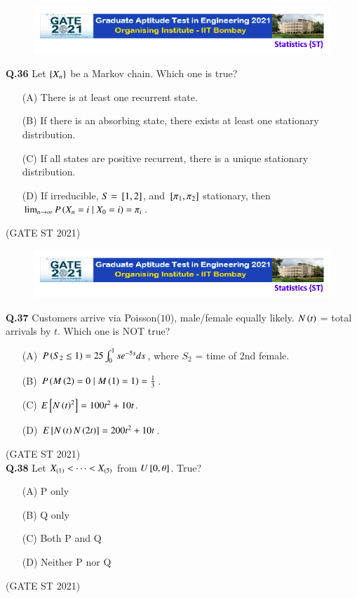 \documentclass[journal,12pt,onecolumn]{IEEEtran}
\theoremstyle{remark}
\begin{document}
\begin{figure}
 \centering
    \includegraphics[width=1\linewidth]{figs/0.png} 
\end{figure}
\textbf{Q.36}
Let $\left\{X_n\right\}$ be a Markov chain. Which one is true?
\begin{enumerate}
\item[(A)] There is at least one recurrent state.
\item[(B)] If there is an absorbing state, there exists at least one stationary distribution.
\item[(C)] If all states are positive recurrent, there is a unique stationary distribution.
\item[(D)] If irreducible, $S = {}\left[1,2\right]$, and ${}\left[\pi_1,\pi_2\right]$ stationary, then $\lim_{n\to\infty} P\left(X_n=i \mid X_0=i\right) = \pi_i$.
\end{enumerate}

\hfill (GATE ST 2021) \\

\begin{figure}
 \centering
    \includegraphics[width=1\linewidth]{figs/0.png} 
\end{figure}
\textbf{Q.37}
Customers arrive via Poisson($10$), male/female equally likely. $N\left(t\right)$ = total arrivals by $t$. Which one is NOT true?
\begin{enumerate}
\item[(A)] $P\left(S_2 \le 1\right) = 25 \int_0^1 s e^{-5s} ds$, where $S_2$ = time of 2nd female.
\item[(B)] $P\left(M\left(2\right) = 0 \mid M\left(1\right) = 1\right) = \frac13$.
\item[(C)] $E{}\left[N\left(t\right)^2\right]= 100t^2 + 10t$.
\item[(D)] $E{}\left[N\left(t\right)N\left(2t\right)\right] = 200t^2 + 10t$.
\end{enumerate}
\hfill (GATE ST 2021) \\

\textbf{Q.38}
Let $X_{\left(1\right)} < \dots < X_{\left(5\right)}$ from $U{}\left[0,\theta\right]$. True?
\begin{enumerate}
\item[(A)] P only
\item[(B)] Q only
\item[(C)] Both P and Q
\item[(D)] Neither P nor Q
\end{enumerate}
\hfill (GATE ST 2021) \\
\end{document}
